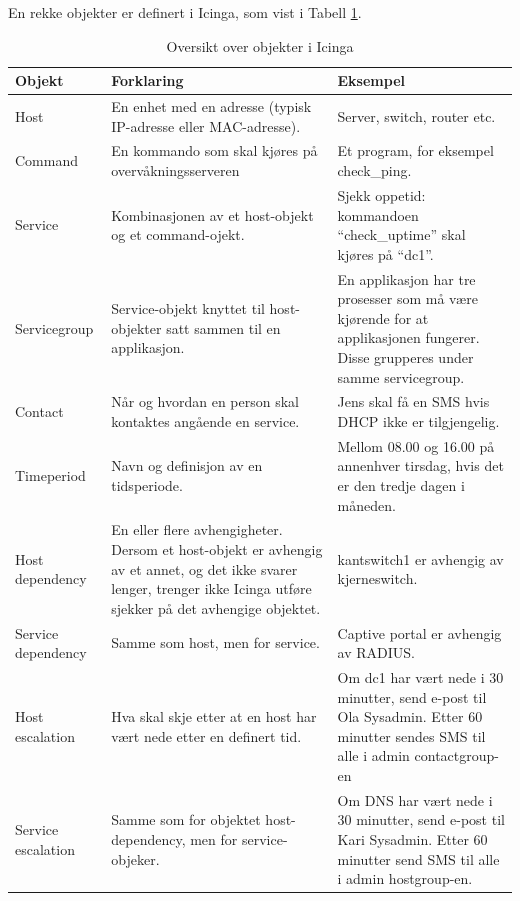 En rekke objekter er definert i Icinga, som vist i Tabell \ref{objekter}.

\begin{changemargin}{-1cm}{-1cm}
\begin{table}
\begin{center}
\begin{tabular}{ | p{3.5cm} | p{6.5cm} | p{6cm} |} \hline
	\textbf{Objekt} & \textbf{Forklaring} & \textbf{Eksempel} \\ \hline
	Host & En enhet med en adresse (typisk IP-adresse eller MAC-adresse). & Server, switch, router etc. \\ \hline
	Command & En kommando som skal kjøres på overvåkningsserveren & Et program, for eksempel check\_ping. \\ \hline 
	Service & Kombinasjonen av et host-objekt og et command-ojekt. & Sjekk oppetid: kommandoen ``check\_uptime'' skal kjøres på ``dc1''. \\ \hline
	Servicegroup & Service-objekt knyttet til host-objekter satt sammen til en applikasjon. & En applikasjon har tre prosesser som må være kjørende for at applikasjonen fungerer. Disse grupperes under samme servicegroup. \\ \hline
	Contact & Når og hvordan en person skal kontaktes angående en service. & Jens skal få en SMS hvis DHCP ikke er tilgjengelig. \\ \hline
	Timeperiod & Navn og definisjon av en tidsperiode. & Mellom 08.00 og 16.00 på annenhver tirsdag, hvis det er den tredje dagen i måneden. \\ \hline
	Host dependency & En eller flere avhengigheter. Dersom et host-objekt er avhengig av et annet, og det ikke svarer lenger, trenger ikke Icinga utføre sjekker på det avhengige objektet. & kantswitch1 er avhengig av kjerneswitch. \\ \hline
	Service dependency & Samme som host, men for service. & Captive portal er avhengig av RADIUS. \\ \hline
	Host escalation & Hva skal skje etter at en host har vært nede etter en definert tid. &	Om dc1 har vært nede i 30 minutter, send e-post til Ola Sysadmin. Etter 60 minutter sendes SMS til alle i admin contactgroup-en \\ \hline
	Service escalation & Samme som for objektet host-dependency, men for service-objeker. & Om DNS har vært nede i 30 minutter, send e-post til Kari Sysadmin. Etter 60 minutter send SMS til alle i admin hostgroup-en. \\ \hline
	\end{tabular}
	\caption{Oversikt over objekter i Icinga}
	\label{objekter}
\end{center}
\end{table}
\end{changemargin}

